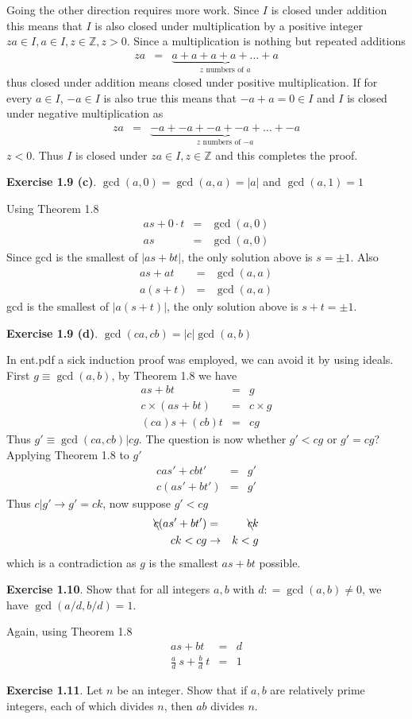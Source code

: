 \documentclass[aps,preprint,preprintnumbers,nofootinbib,showpacs,prd]{revtex4-1}
\newcommand{\nbea}{\begin{eqnarray*}}
\newcommand{\neea}{\end{eqnarray*}}
\begin{document}
Going the other direction requires more work. Since $I$ is closed under addition this means that $I$ is also closed under multiplication by a positive integer $za \in I, a\in I, z \in \mathbb{Z}, z > 0$. Since a multiplication is nothing but repeated additions
%
\nbea
za & = & \underbrace{a + a + a + a + \dots + a}_\text{$z$ numbers of $a$}
\neea
%
thus closed under addition means closed under positive multiplication. If for every $a \in I$, $-a \in I$ is also true this means that $-a + a = 0 \in I$ and $I$ is closed under negative multiplication as
%
\nbea
za & = & \underbrace{-a + -a + -a + -a + \dots + -a}_\text{$z$ numbers of $-a$}
\neea
%
$z < 0$. Thus $I$ is closed under $za \in I, z \in \mathbb{Z}$ and this completes the proof.

{\bf Exercise 1.9 (c)}. $\gcd(a,0) = \gcd(a,a) = |a|$ and $\gcd(a,1) = 1$

Using Theorem 1.8
%
\nbea
as + 0\cdot t & = & \gcd(a,0) \\
as & = & \gcd(a,0)
\neea
%
Since gcd is the smallest of $|as + bt|$, the only solution above is $s=\pm 1$. Also
%
\nbea
as + at & = & \gcd(a,a) \\
a(s + t) & = & \gcd(a,a)
\neea
%
gcd is the smallest of $|a(s + t)|$, the only solution above is $s+t=\pm 1$.

{\bf Exercise 1.9 (d)}. $\gcd(ca,cb) = |c| \gcd(a,b)$

In ent.pdf a sick induction proof was employed, we can avoid it by using ideals. First $g \equiv \gcd(a,b)$, by Theorem 1.8 we have
%
\nbea
as + bt & = & g \\
c \times (as + bt) & = & c \times g \\
(ca)s + (cb)t & = & cg
\neea
%
Thus $ g' \equiv \gcd(ca,cb) | cg$. The question is now whether $g' < cg$ or $g' = cg$? Applying Theorem 1.8 to $g'$
%
\nbea
cas' + cbt' & = & g' \\
c(as' + bt') & = & g'
\neea
%
Thus $c|g' \to g' = ck$, now suppose $g' < cg$
%
\nbea
\bcancel{c}(as' + bt') & = & \bcancel{c}k \\
ck < cg & \to & k < g
\neea
%
which is a contradiction as $g$ is the smallest $as + bt$ possible.

{\bf Exercise 1.10}. Show that for all integers $a, b$ with $d : = \gcd(a, b) \neq 0$, we have
$\gcd(a/d, b/d) = 1$.

Again, using Theorem 1.8
%
\nbea
as + bt & = & d \\
\frac{a}{d} ~s + \frac{b}{d} ~t & = & 1
\neea
%

{\bf Exercise 1.11}. Let $n$ be an integer. Show that if $a, b$ are relatively prime integers,
each of which divides $n$, then $ab$ divides $n$.
\end{document}
